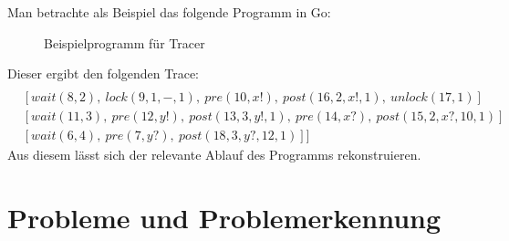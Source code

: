 Man betrachte als Beispiel das folgende Programm in Go:
\begin{figure}
  
  \caption{Beispielprogramm für Tracer}
  \label{Chap:Tracer-Sec:Trace-Fig:Example}
\end{figure}
% 
Dieser ergibt den folgenden Trace:
\begin{align*}
  [&[signal(1, 2),\ signal(2, 3),\ signal(3, 4),\ pre(4, a?, default),\ post(5, default)]\\
  &[wait(8, 2),\ lock(9, 1, -, 1),\ pre(10, x!),\ post(16, 2, x!, 1),\ unlock(17, 1)]\\
  &[wait(11, 3),\ pre(12, y!),\ post(13, 3, y!, 1),\ pre(14, x?),\ post(15, 2, x?, 10, 1)]\\
  &[wait(6, 4),\ pre(7, y?),\ post(18, 3, y?, 12, 1)]]
\end{align*}
Aus diesem lässt sich der relevante Ablauf des Programms rekonstruieren.




\section{Probleme und Problemerkennung}\label{Chap:Back-Sec:Prob}

